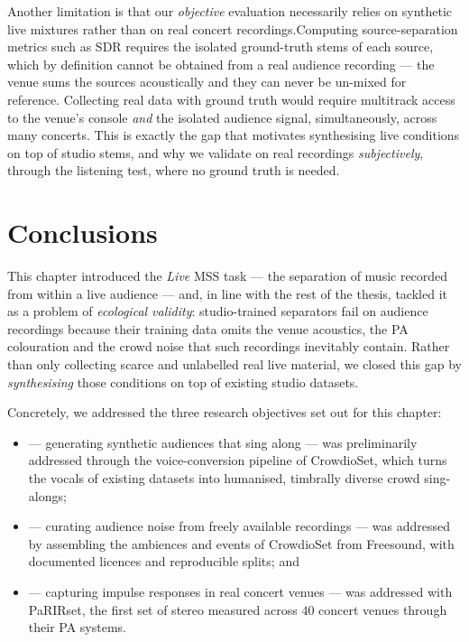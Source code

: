 Another limitation is that our \emph{objective} evaluation necessarily relies on
synthetic live mixtures rather than on real concert recordings.Computing source-separation metrics such as
\acrshort{SDR} requires the isolated ground-truth stems of each source, which by
definition cannot be obtained from a real audience recording --- the venue sums
the sources acoustically and they can never be un-mixed for reference. Collecting
real data with ground truth would require multitrack access to the venue's
console \emph{and} the isolated audience signal, simultaneously, across many
concerts. This is exactly the gap that motivates synthesising live conditions on
top of studio stems, and why we validate on real recordings \emph{subjectively},
through the listening test, where no ground truth is needed.

\section{Conclusions}
\label{sec:mss_conclusions}

This chapter introduced the \emph{Live} \acrshort{MSS} task --- the separation of music
recorded from within a live audience --- and, in line with the rest of the thesis, tackled
it as a problem of \emph{ecological validity}: studio-trained separators fail on
audience recordings because their training data omits the venue acoustics, the
\acrshort{PA} colouration and the crowd noise that such recordings inevitably
contain. Rather than only collecting scarce and unlabelled real live material, we
closed this gap by \emph{synthesising} those conditions on top of existing
studio datasets.

Concretely, we addressed the three research objectives set out for this chapter:
\begin{itemize}
    \item {} --- generating synthetic audiences that sing along --- was
    preliminarily addressed through the voice-conversion pipeline of CrowdioSet, which turns
    the vocals of existing datasets into humanised, timbrally diverse crowd
    sing-alongs;
    \item {} --- curating audience noise from freely available
    recordings --- was addressed by assembling the ambiences and events of
    CrowdioSet from Freesound, with documented licences and reproducible splits;
    and
    \item {} --- capturing impulse responses in real concert venues ---
    was addressed with PaRIRset, the first set of stereo 
    measured across $40$ concert venues through their \acrshort{PA} systems.
\end{itemize}

